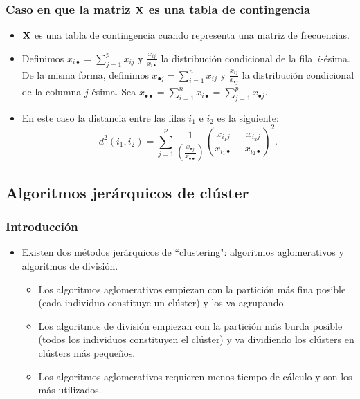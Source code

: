 \begin{frame}
\frametitle{Caso en que la matriz $\mathbf{X}$ es una tabla de contingencia}
\begin{itemize}
\item<2->{$\mathbf{X}$ es una tabla de contingencia cuando representa una matriz de frecuencias.}
\item<3->{Definimos $x_{i\bullet}=\sum_{j=1}^p x_{ij}$ y $\frac{x_{ij}}{x_{i\bullet}}$ la distribución condicional de la fila~$i$-ésima. De la misma forma, definimos $x_{\bullet j}=\sum_{i=1}^n x_{ij}$ y $\frac{x_{ij}}{x_{\bullet j}}$ la distribución condicional de la columna $j$-ésima. Sea $x_{\bullet\bullet}=\sum_{i=1}^n  x_{i\bullet} = \sum_{j=1}^p x_{\bullet j}$.}
\item<4->{En este caso la distancia entre las filas $i_1$ e $i_2$ es la siguiente:
$$
d^2 (i_1, i_2)=\sum_{j=1}^p \frac{1}{\left(\frac{x_{\bullet j}}{x_{\bullet\bullet}}\right)} \left(\frac{x_{i_1 j}}{x_{i_1\bullet}} - \frac{x_{i_2 j}}{x_{i_2\bullet}}\right)^2.
$$}
\end{itemize}
\end{frame}
\subsection{Algoritmos jerárquicos de clúster}
\begin{frame}
\frametitle{Introducción}
\begin{itemize}
\item<2->{Existen dos métodos jerárquicos de ``clustering": algoritmos aglomerativos y algoritmos de división.}
\begin{itemize}
\item<3->{Los algoritmos  aglomerativos empiezan con la partición más fina posible (cada individuo constituye un clúster) y los va agrupando.}
\item<4->{Los algoritmos  de división empiezan con la partición más burda posible (todos los individuos constituyen el clúster) y va dividiendo los clústers en clústers más pequeños.}
\item<5->{Los algoritmos aglomerativos requieren menos tiempo de cálculo y son los más utilizados.}
\end{itemize}
\end{itemize}
\end{frame}
\iffalse
\begin{frame}
\frametitle{Introducción}
\uncover<2->{La diferencia esencial entre los dos métodos de ``clustering'' es que en los métodos jerárquicos las asignaciones de los elementos a los grupos, una vez hallados éstos, no se pueden cambiar; en cambio, en los métodos de partición, sí.}
\end{frame}
\fi
